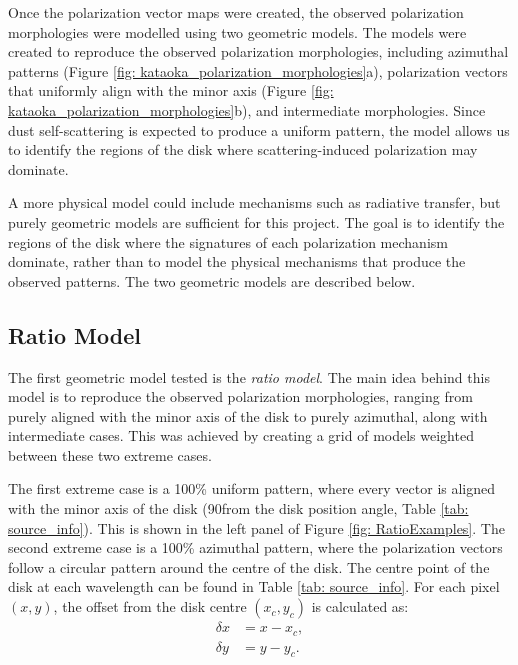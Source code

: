 

Once the polarization vector maps were created, the observed polarization morphologies were modelled using two geometric models. The models were created to reproduce the observed polarization morphologies, including azimuthal patterns (Figure \ref{fig: kataoka_polarization_morphologies}a), polarization vectors that uniformly align with the minor axis (Figure \ref{fig: kataoka_polarization_morphologies}b), and intermediate morphologies. Since dust self-scattering is expected to produce a uniform pattern, the model allows us to identify the regions of the disk where scattering-induced polarization may dominate. 

A more physical model could include mechanisms such as radiative transfer, but purely geometric models are sufficient for this project. The goal is to identify the regions of the disk where the signatures of each polarization mechanism dominate, rather than to model the physical mechanisms that produce the observed patterns. The two geometric models are described below.

\subsection{Ratio Model}
The first geometric model tested is the \emph{ratio model}. The main idea behind this model is to reproduce the observed polarization morphologies, ranging from purely aligned with the minor axis of the disk to purely azimuthal, along with intermediate cases. This was achieved by creating a grid of models weighted between these two extreme cases. 

The first extreme case is a 100\% uniform pattern, where every vector is aligned with the minor axis of the disk (90\degg from the disk position angle, Table \ref{tab: source_info}).  This is shown in the left panel of Figure \ref{fig: RatioExamples}. The second extreme case is a 100\% azimuthal pattern, where the polarization vectors follow a circular pattern around the centre of the disk. The centre point of the disk at each wavelength can be found in Table \ref{tab: source_info}. For each pixel $(x, y)$, the offset from the disk centre $(x_c, y_c)$ is calculated as:
\begin{equation}
\begin{aligned}
    \delta x &= x - x_c, \\
    \delta y &= y - y_c.
\end{aligned}
\end{equation}


